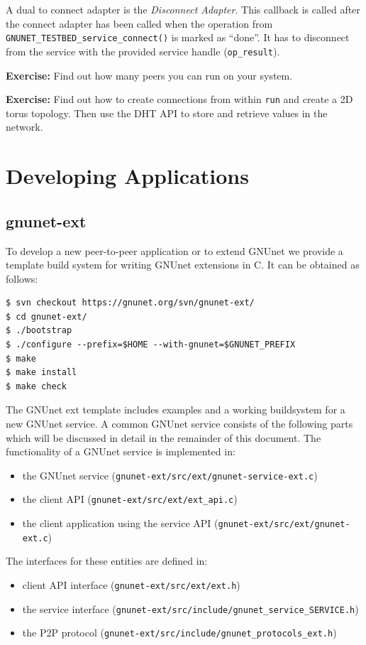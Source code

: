 \documentclass[10pt]{article}
\newcommand{\exercise}[1]{\noindent\begin{boxedminipage}{\textwidth}{\bf Exercise:} #1 \end{boxedminipage}}
\begin{document}
A dual to connect adapter is the \textit{Disconnect Adapter}.  This callback is
called after the connect adapter has been called when the operation from
\texttt{GNUNET\_TESTBED\_service\_connect()} is marked as ``done''.  It has to
disconnect from the service with the provided service handle (\texttt{op\_result}).

\exercise{Find out how many peers you can run on your system.}

\exercise{Find out how to create connections from within {\tt run} and create a
  2D torus topology.  Then use the DHT API to store and retrieve values in the
  network.}

\section{Developing Applications}
\subsection{gnunet-ext}
To develop a new peer-to-peer application or to extend GNUnet we provide
a template build system for writing GNUnet extensions in C. It can be
obtained as follows:

\lstset{language=bash}
\begin{lstlisting}
$ svn checkout https://gnunet.org/svn/gnunet-ext/
$ cd gnunet-ext/
$ ./bootstrap
$ ./configure --prefix=$HOME --with-gnunet=$GNUNET_PREFIX
$ make
$ make install
$ make check
\end{lstlisting}

The GNUnet ext template includes examples and a working buildsystem for a new GNUnet service.
A common GNUnet service consists of the following parts which will be discussed in detail in the
remainder of this document. The functionality of a GNUnet service is implemented in:

\begin{itemize}
\itemsep0em
  \item the GNUnet service (\lstinline|gnunet-ext/src/ext/gnunet-service-ext.c|)
  \item the client API (\lstinline|gnunet-ext/src/ext/ext_api.c|)
  \item the client application using the service API (\lstinline|gnunet-ext/src/ext/gnunet-ext.c|) 


\end{itemize}

The interfaces for these entities are defined in:
\begin{itemize}
\itemsep0em
  \item client API interface (\lstinline|gnunet-ext/src/ext/ext.h|) 
  \item the service interface (\lstinline|gnunet-ext/src/include/gnunet_service_SERVICE.h|)
  \item the P2P protocol (\lstinline|gnunet-ext/src/include/gnunet_protocols_ext.h|)
\end{itemize}
\end{document}
